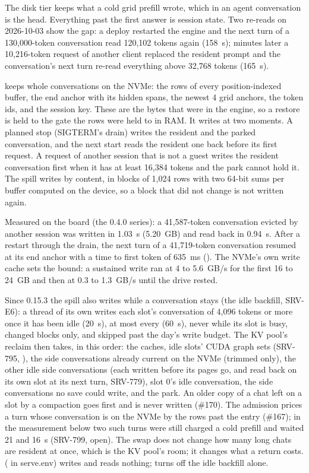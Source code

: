 The disk tier keeps what a cold grid prefill wrote, which in an agent conversation is the head. Everything past the first answer is session state. Two re-reads on 2026-10-03 show the gap: a deploy restarted the engine and the next turn of a 130,000-token conversation read 120,102 tokens again (158~s); minutes later a 10,216-token request of another client replaced the resident prompt and the conversation's next turn re-read everything above 32,768 tokens (165~s).

 keeps whole conversations on the NVMe: the rows of every position-indexed buffer, the end anchor with its hidden spans, the newest 4 grid anchors, the token ids,  and the session key. These are the bytes that were in the engine, so a restore is held to the gate the rows were held to in RAM. It writes at two moments. A planned stop (SIGTERM's drain) writes the resident and the parked conversation, and the next start reads the resident one back before its first request. A request of another session that is not a guest writes the resident conversation first when it has at least 16,384 tokens and the park cannot hold it. The spill writes by content, in blocks of 1,024 rows with two 64-bit sums per buffer computed on the device, so a block that did not change is not written again.

Measured on the board (the 0.4.0 series): a 41,587-token conversation evicted by another session was written in 1.03~s (5.20~GB) and read back in 0.94~s. After a restart through the drain, the next turn of a 41,719-token conversation resumed at its end anchor with a time to first token of 635~ms (\measured). The NVMe's own write cache sets the bound: a sustained write ran at 4 to 5.6~GB/s for the first 16 to 24~GB and then at 0.3 to 1.3~GB/s until the drive rested.

Since 0.15.3 the spill also writes while a conversation stays (the idle backfill, SRV-E6): a thread of its own writes each slot's conversation of 4,096 tokens or more once it has been idle  (20~s), at most every  (60~s), never while its slot is busy, changed blocks only, and skipped past the day's write budget. The KV pool's reclaim then takes, in this order: the caches, idle slots' CUDA graph sets (SRV-795, ), the side conversations already current on the NVMe (trimmed only), the other idle side conversations (each written before its pages go, and read back on its own slot at its next turn, SRV-779), slot 0's idle conversation, the side conversations no save could write, and the park. An older copy of a chat left on a slot by a compaction goes first and is never written (\#170). The admission prices a turn whose conversation is on the NVMe by the rows past the entry (\#167); in the measurement below two such turns were still charged a cold prefill and waited 21 and 16~s (SRV-799, open). The swap does not change how many long chats are resident at once, which is the KV pool's room; it changes what a return costs.  ( in serve.env) writes and reads nothing;  turns off the idle backfill alone.

